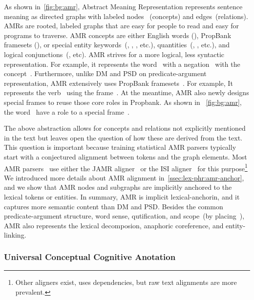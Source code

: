 As shown in~\autoref{fig:bg:amr}, Abstract Meaning Representation
represents sentence meaning as directed graphs with labeled nodes
~(concepts) and edges~(relations). AMRs are rooted, labeled graphs
that are easy for people to read and easy for programs to traverse.
AMR concepts are either English words (), PropBank
framesets (), or special entity
keywords~(, , ,
etc.), quantities~(,
, etc.), and logical
conjunctions~(, etc).  AMR strives for a more logical,
less syntactic representation. For example, it represents the
word~ with a negation~
with the concept~. Furthermore, unlike DM and PSD
on predicate-argument representation, AMR extensively uses PropBank
framesets~\citep{Kin:Pal:02, palmer2005proposition}. For example, It
represents the verb~ using the
frame~. At the meantime, AMR also newly designs
special frames to reuse those core roles in Propbank. As shown in
~\autoref{fig:bg:amr}, the word~ have a role
 to a special frame~.

The above abstraction allows for concepts and relations not explicitly
mentioned in the text but leaves open the question of how these are
derived from the text. This question is important because training
statistical AMR parsers typically start with a conjectured alignment
between tokens and the graph elements. Most AMR
parsers~\cite[\eg][]{Flanigan:2014vc,Wang:2015uo,Artzi:2009tb,Pust:2015ug,Peng:2015tj,Konstas:2017uj,Wang:2017vt}
use either the JAMR aligner~\cite{Flanigan:2014vc} or the ISI
aligner~\cite{Pourdamghani:2014aligning} for this
purpose\footnote{Other aligners exist, \eg
  \citet{chen2017unsupervised} uses dependencies, but raw text
  alignments are more prevalent.}  We introduced more details about
AMR alignment in~\autoref{ssec:lex-phr:amr-anchor}, and we show that
AMR nodes and subgraphs are implicitly anchored to the lexical tokens
or entities. In summary, AMR is implicit lexical-anchorin, and it
captures more semantic content than DM and PSD. Besides the common
predicate-argument structure, word sense, qutification, and scope~(by
placing~), AMR also represents the lexical
decomposion, anaphoric coreference, and entity-linking.

\subsubsection{Universal Conceptual Cognitive Anotation}
\label{ssec:bg:ucca}

